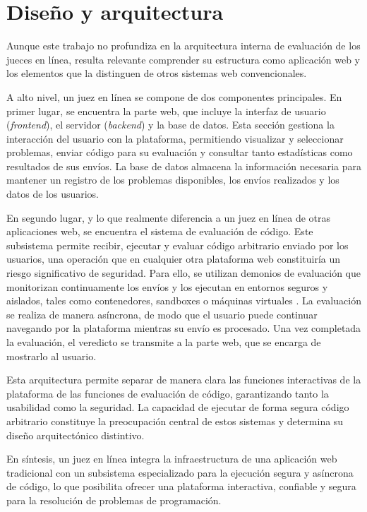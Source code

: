 \section{Diseño y arquitectura}

Aunque este trabajo no profundiza en la arquitectura interna de evaluación de los jueces en línea, resulta relevante comprender su estructura como aplicación web y los elementos que la distinguen de otros sistemas web convencionales.

A alto nivel, un juez en línea se compone de dos componentes principales. En primer lugar, se encuentra la parte web, que incluye la interfaz de usuario (\textit{frontend}), el servidor (\textit{backend}) y la base de datos. Esta sección gestiona la interacción del usuario con la plataforma, permitiendo visualizar y seleccionar problemas, enviar código para su evaluación y consultar tanto estadísticas como resultados de sus envíos. La base de datos almacena la información necesaria para mantener un registro de los problemas disponibles, los envíos realizados y los datos de los usuarios.

En segundo lugar, y lo que realmente diferencia a un juez en línea de otras aplicaciones web, se encuentra el sistema de evaluación de código. Este subsistema permite recibir, ejecutar y evaluar código arbitrario enviado por los usuarios, una operación que en cualquier otra plataforma web constituiría un riesgo significativo de seguridad. Para ello, se utilizan demonios de evaluación que monitorizan continuamente los envíos y los ejecutan en entornos seguros y aislados, tales como contenedores, sandboxes o máquinas virtuales \citep{Kuo_Wen_Hsieh_Huang_2023}. La evaluación se realiza de manera asíncrona, de modo que el usuario puede continuar navegando por la plataforma mientras su envío es procesado. Una vez completada la evaluación, el veredicto se transmite a la parte web, que se encarga de mostrarlo al usuario.

Esta arquitectura permite separar de manera clara las funciones interactivas de la plataforma de las funciones de evaluación de código, garantizando tanto la usabilidad como la seguridad. La capacidad de ejecutar de forma segura código arbitrario constituye la preocupación central de estos sistemas y determina su diseño arquitectónico distintivo.

En síntesis, un juez en línea integra la infraestructura de una aplicación web tradicional con un subsistema especializado para la ejecución segura y asíncrona de código, lo que posibilita ofrecer una plataforma interactiva, confiable y segura para la resolución de problemas de programación.

